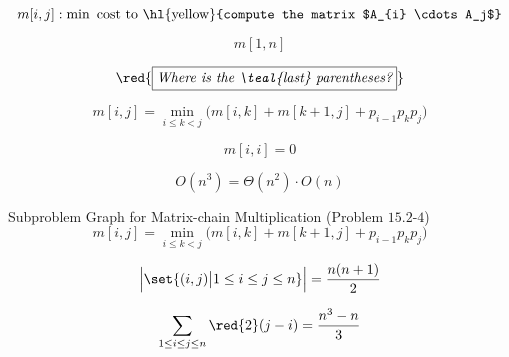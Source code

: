 
\begin{frame}{}
  \centerline{\LARGE {}}

  \vspace{0.50cm}
\end{frame}

\begin{frame}{}
  \[
    m[i,j]: \min \text{ cost to \hl{yellow}{compute the matrix $A_{i} \cdots A_j$}}
  \]

  \[
    m[1,n]
  \]

  \pause
  \[
    \red{\fbox{\it Where is the {\teal{last}} parentheses?}}
  \]

  \pause
  \[
    m[i,j] = \min_{i \le k <j} \Big(m[i,k] + m[k+1,j] + p_{i-1}p_{k}p_{j}\Big)
  \]

  \pause
  \[
    m[i,i] = 0
  \]

  \pause
  \[
    O(n^3) = \Theta(n^2) \cdot O(n)
  \]
\end{frame}

\begin{frame}{}
  \begin{exampleblock}{Subproblem Graph for Matrix-chain Multiplication (Problem $15.2$-$4$)}
    \[
      m[i,j] = \min_{i \le k <j} \Big(m[i,k] + m[k+1,j] + p_{i-1}p_{k}p_{j}\Big)
    \]

  \end{exampleblock}

  \pause
  \[
    \Big\vert \set{(i,j) \big\vert 1 \le i \le j \le n} \Big\vert = \frac{n (n+1)}{2}
  \]

  \pause
  \[
    \sum_{1 \le i \le j \le n} \red{2}(j - i) = \frac{n^3 - n}{3} %
  \]
\end{frame}
